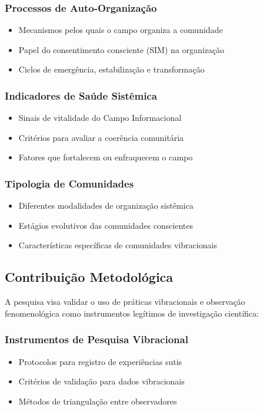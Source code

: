 \subsubsection{Processos de Auto-Organização}
\begin{itemize}
    \item Mecanismos pelos quais o campo organiza a comunidade
    \item Papel do consentimento consciente (SIM) na organização
    \item Ciclos de emergência, estabilização e transformação
\end{itemize}

\subsubsection{Indicadores de Saúde Sistêmica}
\begin{itemize}
    \item Sinais de vitalidade do Campo Informacional
    \item Critérios para avaliar a coerência comunitária
    \item Fatores que fortalecem ou enfraquecem o campo
\end{itemize}

\subsubsection{Tipologia de Comunidades}
\begin{itemize}
    \item Diferentes modalidades de organização sistêmica
    \item Estágios evolutivos das comunidades conscientes
    \item Características específicas de comunidades vibracionais
\end{itemize}

\subsection{Contribuição Metodológica}

A pesquisa visa validar o uso de práticas vibracionais e observação fenomenológica como instrumentos legítimos de investigação científica:

\subsubsection{Instrumentos de Pesquisa Vibracional}
\begin{itemize}
    \item Protocolos para registro de experiências sutis
    \item Critérios de validação para dados vibracionais
    \item Métodos de triangulação entre observadores
\end{itemize}

